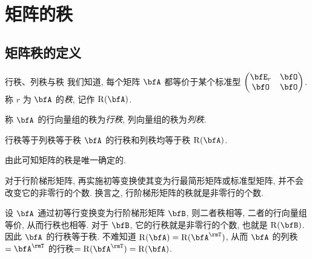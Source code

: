 \section{矩阵的秩}

\subsection{矩阵秩的定义}


\begin{frame}{行秩、列秩与秩}
	\onslide<+->
	我们知道, 每个矩阵 $\bfA$ 都等价于某个标准型
	$\begin{pmatrix}
		\bfE_r&\bfO\\
		\bfO&\bfO
	\end{pmatrix}$.
	\onslide<+->
	称 $r$ 为 $\bfA$ 的\emph{秩}, 记作 \alert{$\rank(\bfA)$}.

	\onslide<+->
	称 $\bfA$ 的行向量组的秩为\emph{行秩}, 列向量组的秩为\emph{列秩}.
	\onslide<+->
	\begin{algorithm}{行秩等于列秩等于秩}
		$\bfA$ 的行秩和列秩均等于秩 $\rank(\bfA)$.
	\end{algorithm}
	\onslide<+->
	由此可知矩阵的秩是唯一确定的.

	\onslide<+->
	对于行阶梯形矩阵, 再实施初等变换使其变为行最简形矩阵或标准型矩阵, 并不会改变它的非零行的个数.
	\onslide<+->
	换言之, \alert{行阶梯形矩阵的秩就是非零行的个数}.

	\onslide<+->
	设 $\bfA$ 通过初等行变换变为行阶梯形矩阵 $\bfB$, 则二者秩相等, 二者的行向量组等价, 从而行秩也相等.
	\onslide<+->
	对于 $\bfB$, 它的行秩就是非零行的个数, 也就是 $\rank(\bfB)$.
	\onslide<+->
	因此 $\bfA$ 的行秩等于秩.
	\onslide<+->
	不难知道 $\rank(\bfA)=\rank(\bfA^\rmT)$,
	从而 $\bfA$ 的列秩$=\bfA^\rmT$ 的行秩$=\rank(\bfA^\rmT)=\rank(\bfA)$.
\end{frame}


